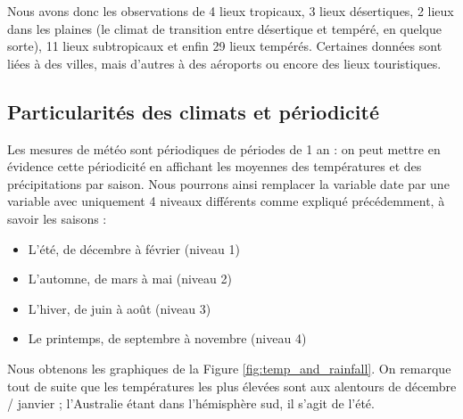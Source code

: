\documentclass{article}
\begin{document}
Nous avons donc les observations de 4 lieux tropicaux, 3 lieux désertiques, 2 lieux dans les plaines (le climat de transition entre désertique et tempéré, en quelque sorte), 11 lieux subtropicaux et enfin 29 lieux tempérés. Certaines données sont liées à des villes, mais d'autres à des aéroports ou encore des lieux touristiques.

\subsection{Particularités des climats et périodicité}

Les mesures de météo sont périodiques de périodes de 1 an : on peut mettre en évidence cette périodicité en affichant les moyennes des températures et des précipitations par saison. Nous pourrons ainsi remplacer la variable date par une variable avec uniquement 4 niveaux différents comme expliqué précédemment, à savoir les saisons :
\begin{itemize}
    \item L’été, de décembre à février (niveau 1)
    \item L’automne, de mars à mai (niveau 2)
    \item L’hiver, de juin à août (niveau 3)
    \item Le printemps, de septembre à novembre (niveau 4)
\end{itemize}
Nous obtenons les graphiques de la Figure \ref{fig:temp_and_rainfall}. On remarque tout de suite que les températures les plus élevées sont aux alentours de décembre / janvier ; l'Australie étant dans l'hémisphère sud, il s'agit de l'été. 
\end{document}
